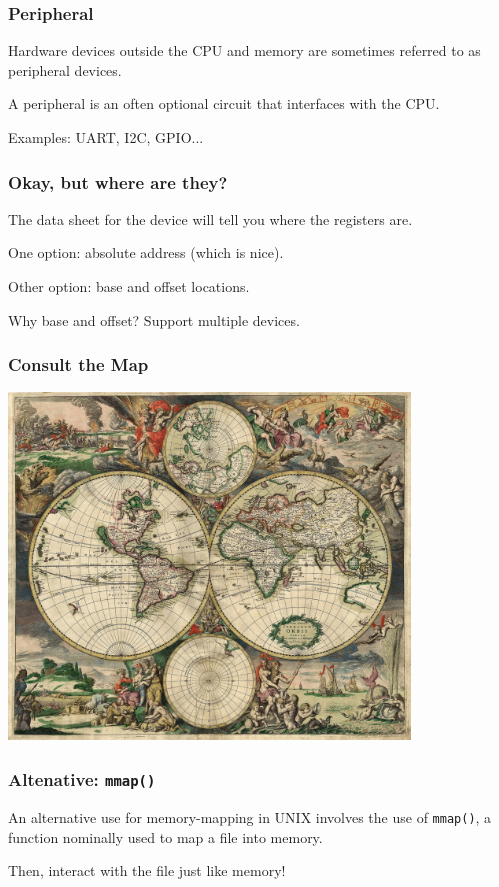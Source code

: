 \begin{frame}
\frametitle{Peripheral}

Hardware devices outside the CPU and memory are sometimes referred to as peripheral devices.

A peripheral is an often optional circuit that interfaces with the CPU.

Examples: UART, I2C, GPIO...

\end{frame}


\begin{frame}
\frametitle{Okay, but where are they?}

The data sheet for the device will tell you where the registers are.

One option: absolute address (which is nice).

Other option: base and offset locations.

Why base and offset? Support multiple devices.


\end{frame}



\begin{frame}
	\frametitle{Consult the Map}

	\begin{center}
		\includegraphics[width=0.8\textwidth]{images/worldmap.jpg}
	\end{center}


\end{frame}


\begin{frame}
	\frametitle{Altenative: \texttt{mmap()}}

	An alternative use for memory-mapping in UNIX involves the use of \texttt{mmap()}, a function nominally used to map a file into memory.

	Then, interact with the file just like memory!

\end{frame}


